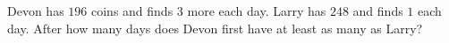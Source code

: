 Devon has $196$ coins and finds $3$ more each day. Larry has $248$ and finds $1$ each day. After how many days does Devon first have at least as many as Larry?
